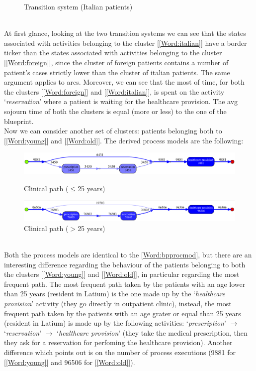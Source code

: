 \begin{figure} [htbp]
\begin{minipage}[t]{0.5\textwidth}
\caption{Transition system (Italian patients)}
\end{minipage}
\end{figure}\\
At first glance, looking at the two transition systems we can see that the states associated with activities belonging to the cluster [\ref{Word:italian}] have a border ticker than the states associated with activities belonging to the cluster [\ref{Word:foreign}], since the cluster of foreign patients contains a number of
patient's cases strictly lower than the cluster of italian patients. The same argument applies to arcs. Moreover, we can see that the most of time, for both the clusters [\ref{Word:foreign}] and [\ref{Word:italian}], is spent on the activity `\textit{reservation}' where a patient is waiting for the healthcare provision. %
The avg sojourn time of both the clusters is equal (more or less) to the one of the blueprint.\\
Now we can consider another set of clusters: patients belonging both to [\ref{Word:young}] and [\ref{Word:old}]. The derived process models are the following:
\begin{figure} [htbp]
\includegraphics[width=\textwidth]{AmbulatoriInductiveVisualMinerYoungs}
\caption{Clinical path ($\leq$25 years)}
\includegraphics[width=\textwidth]{AmbulatoriInductiveVisualMinerOlds}
\caption{Clinical path ($>$25 years)}
\end{figure}\\
Both the process models are identical to the \ref{Word:bpprocmod}, but there are an interesting difference regarding the behaviour of the patients belonging to both the clusters [\ref{Word:young}] and [\ref{Word:old}], in particular regarding the most frequent path. The most frequent path taken by the patients with an age lower than 25 years (resident in Latium) is the one made up by the `\textit{healthcare provision}' activity (they go directly in outpatient clinic), instead, the most frequent path taken by the patients with an age grater or equal than 25 years (resident in Latium) is made up by the following activities: `\textit{prescription}' $ \rightarrow $ `\textit{reservation}' $ \rightarrow$ `\textit{healthcare provision}' (they take the medical prescription, then they ask for a reservation for perfoming the healthcare provision). Another difference which points out is on the number of process executions (9881 for [\ref{Word:young}] and 96506 for [\ref{Word:old}]).\\
